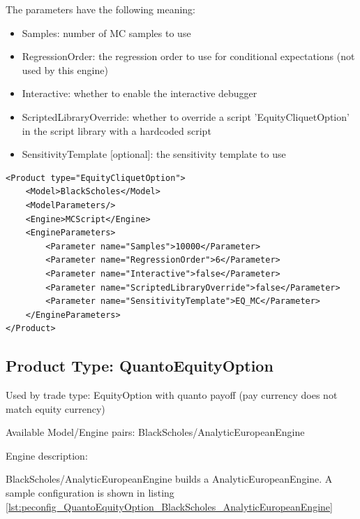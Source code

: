 The parameters have the following meaning:

\begin{itemize}
\item Samples: number of MC samples to use
\item RegressionOrder: the regression order to use for conditional expectations (not used by this engine)
\item Interactive: whether to enable the interactive debugger
\item ScriptedLibraryOverride: whether to override a script 'EquityCliquetOption' in the script library with a hardcoded script
\item SensitivityTemplate [optional]: the sensitivity template to use
\end{itemize}

\begin{longlisting}
\begin{verbatim}
<Product type="EquityCliquetOption">
    <Model>BlackScholes</Model>
    <ModelParameters/>
    <Engine>MCScript</Engine>
    <EngineParameters>
        <Parameter name="Samples">10000</Parameter>
        <Parameter name="RegressionOrder">6</Parameter>
        <Parameter name="Interactive">false</Parameter>
        <Parameter name="ScriptedLibraryOverride">false</Parameter>
        <Parameter name="SensitivityTemplate">EQ_MC</Parameter>
    </EngineParameters>
</Product>
\end{verbatim}
\caption{Configuration for Product EquityCliquetOption, Model BlackScholes, Engine MCScript}
\label{lst:peconfig_EquityCliquetOption_BlackScholes_MCScript}
\end{longlisting}

\subsection{Product Type: QuantoEquityOption}

Used by trade type: EquityOption with quanto payoff (pay currency does not match equity currency)

Available Model/Engine pairs: BlackScholes/AnalyticEuropeanEngine

Engine description:

BlackScholes/AnalyticEuropeanEngine builds a AnalyticEuropeanEngine. A sample configuration is shown in listing
\ref{lst:peconfig_QuantoEquityOption_BlackScholes_AnalyticEuropeanEngine}

